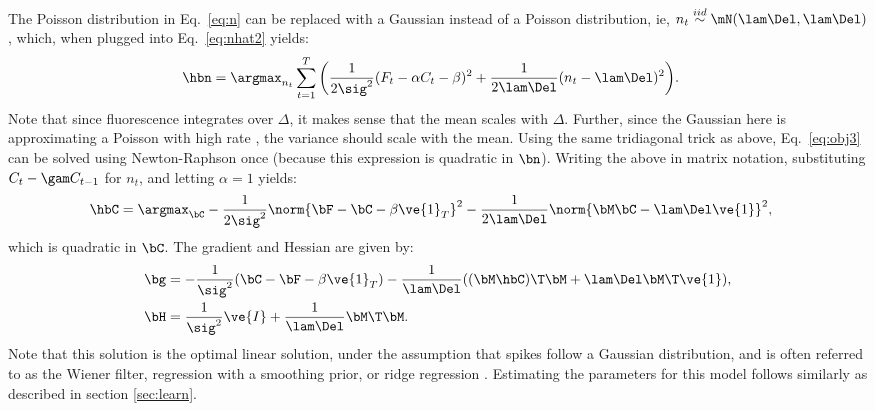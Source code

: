 The Poisson distribution in Eq.~\eqref{eq:n} can be replaced with a Gaussian instead of a Poisson distribution, ie,  $n_t \overset{iid}{\sim} \mN(\lam \Del, \lam \Del)$, which, when plugged into Eq.~\eqref{eq:nhat2} yields:
\begin{align} \label{eq:obj5}
\hbn &= \argmax_{n_t}  \sum_{t=1}^T \bigg( \frac{1}{2 \sig^2}(F_t - \alpha C_t - \beta)^2  + 
 \frac{1}{2 \lam \Del}(n_t - \lam \Del)^2\bigg).
\end{align}
Note that since fluorescence integrates over $\Delta$, it makes sense that the mean scales with $\Delta$.  Further, since the Gaussian here is approximating a Poisson with high rate \cite{SjulsonMiesenbock07}, the variance should scale with the mean.  Using the same tridiagonal trick as above, Eq.~\eqref{eq:obj3} can be solved using Newton-Raphson once (because this expression is quadratic in $\bn$).  Writing the above in matrix notation, substituting $C_t - \gam C_{t-1}$ for $n_t$, and letting $\alpha=1$ yields:
\begin{align}   \label{eq:w2}
\hbC&= \argmax_{\bC} -\frac{1}{2\sig^2} \norm{\bF - \bC - \beta\ve{1}_T}^2 - \frac{1}{2\lam\Del} \norm{\bM \bC - \lam\Del\ve{1}}^2,
\end{align}
\noindent which is quadratic in $\bC$.  The gradient and Hessian are given by:
\begin{align}
\bg &= -\frac{1}{\sig^2} (\bC - \bF - \beta\ve{1}_T) - \frac{1}{\lam\Del} ( (\bM \hbC)\T \bM + \lam\Del \bM\T \ve{1}), \\
\bH &= \frac{1}{\sig^2} \ve{I} + \frac{1}{\lam\Del} \bM\T \bM.
\end{align}
Note that this solution is the optimal linear solution, under the assumption that spikes follow a Gaussian distribution, and is often referred to as the Wiener filter, regression with a smoothing prior, or ridge regression \cite{CONV04}.  Estimating the parameters for this model follows similarly as described in section \ref{sec:learn}.
